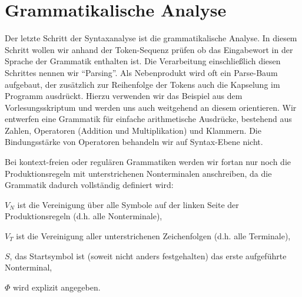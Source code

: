 \section{Grammatikalische Analyse}
Der letzte Schritt der Syntaxanalyse ist die grammatikalische Analyse. In diesem Schritt wollen wir anhand der Token-Sequenz prüfen ob das Eingabewort in der Sprache der Grammatik enthalten ist. Die Verarbeitung einschließlich diesen Schrittes nennen wir ``Parsing''. Als Nebenprodukt wird oft ein Parse-Baum aufgebaut, der zusätzlich zur Reihenfolge der Tokens auch die Kapselung im Programm ausdrückt.
Hierzu verwenden wir das Beispiel aus dem Vorlesungsskriptum und werden uns auch weitgehend an diesem orientieren.
Wir entwerfen eine Grammatik für einfache arithmetische Ausdrücke, bestehend aus Zahlen, Operatoren (Addition und Multiplikation) und Klammern. Die Bindungsstärke von Operatoren
behandeln wir auf Syntax-Ebene nicht.

Bei kontext-freien oder regulären Grammatiken werden wir fortan nur noch die Produktionsregeln mit unterstrichenen Nonterminalen anschreiben, da die Grammatik dadurch vollständig definiert wird:
\begin{\whichitem}
\item $V_N$ ist die Vereinigung über alle Symbole auf der linken Seite der Produktionsregeln (d.h. alle Nonterminale),
\item $V_T$ ist die Vereinigung aller unterstrichenen Zeichenfolgen (d.h. alle Terminale),
\item $S$, das Startsymbol ist (soweit nicht anders festgehalten) das erste aufgeführte Nonterminal,
\item $\Phi$ wird explizit angegeben.
\end{\whichitem}

